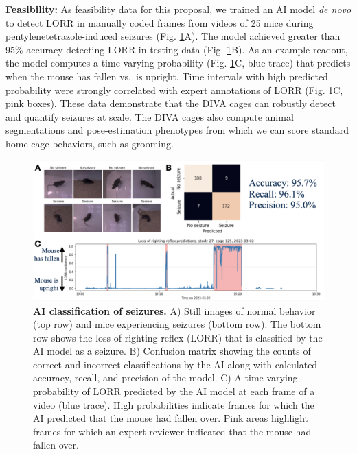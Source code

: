 \documentclass[
  12pt,
]{article}
\begin{document}
\textbf{Feasibility:} As feasibility data for this proposal, we trained
an AI model \textit{de novo} to detect LORR in manually coded frames
from videos of 25 mice during pentylenetetrazole-induced seizures (Fig.
\ref{fig:LORR}A). The model achieved greater than 95\% accuracy
detecting LORR in testing data (Fig. \ref{fig:LORR}B). As an example
readout, the model computes a time-varying probability (Fig.
\ref{fig:LORR}C, blue trace) that predicts when the mouse has fallen
vs.~is upright. Time intervals with high predicted probability were
strongly correlated with expert annotations of LORR (Fig.
\ref{fig:LORR}C, pink boxes). These data demonstrate that the DIVA cages
can robustly detect and quantify seizures at scale. The DIVA cages also
compute animal segmentations and pose-estimation phenotypes from which
we can score standard home cage behaviors, such as grooming.

\begin{figure}[ht!]
\includegraphics[width=\textwidth]{Fig4.png} 
\caption{\textbf{AI classification of seizures.} A) Still images of normal behavior (top row) and mice experiencing seizures (bottom row). The bottom row shows the loss-of-righting reflex (LORR) that is classified by the AI model as a seizure. B) Confusion matrix showing the counts of correct and incorrect classifications by the AI along with calculated accuracy, recall, and precision of the model. C) A time-varying probability of LORR predicted by the AI model at each frame of a video (blue trace). High probabilities indicate frames for which the AI predicted that the mouse had fallen over. Pink areas highlight frames for which an expert reviewer indicated that the mouse had fallen over.}
\label{fig:LORR}
\end{figure}
\end{document}
